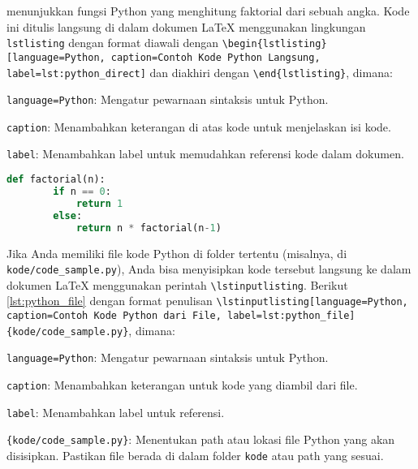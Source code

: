  menunjukkan fungsi Python yang menghitung faktorial dari sebuah angka. Kode ini ditulis langsung di dalam dokumen LaTeX menggunakan lingkungan \texttt{lstlisting} dengan format diawali dengan \texttt{\textbackslash begin\{lstlisting\}[language=Python, caption=Contoh Kode Python Langsung, label=lst:python\_direct]} dan diakhiri dengan \texttt{\textbackslash end\{lstlisting\}}, dimana:
\begin{packed_item}
    \item \texttt{language=Python}: Mengatur pewarnaan sintaksis untuk Python.
    \item \texttt{caption}: Menambahkan keterangan di atas kode untuk menjelaskan isi kode.
    \item \texttt{label}: Menambahkan label untuk memudahkan referensi kode dalam dokumen.
\end{packed_item}

\begin{lstlisting}[language=Python, caption=Contoh Kode Python Langsung, label=lst:python_direct]
    def factorial(n):
        if n == 0:
            return 1
        else:
            return n * factorial(n-1)
\end{lstlisting}

Jika Anda memiliki file kode Python di folder tertentu (misalnya, di \texttt{kode/code\_sample.py}), Anda bisa menyisipkan kode tersebut langsung ke dalam dokumen LaTeX menggunakan perintah \texttt{\textbackslash lstinputlisting}. Berikut \cref{lst:python_file} dengan format penulisan \texttt{\textbackslash lstinputlisting[language=Python, caption=Contoh Kode Python dari File, label=lst:python\_file]\{kode/code\_sample.py\}}, dimana:
\begin{packed_item}
    \item \texttt{language=Python}: Mengatur pewarnaan sintaksis untuk Python.
    \item \texttt{caption}: Menambahkan keterangan untuk kode yang diambil dari file.
    \item \texttt{label}: Menambahkan label untuk referensi.
    \item \texttt{\{kode/code\_sample.py\}}: Menentukan path atau lokasi file Python yang akan disisipkan. Pastikan file berada di dalam folder \texttt{kode} atau path yang sesuai.
\end{packed_item}



